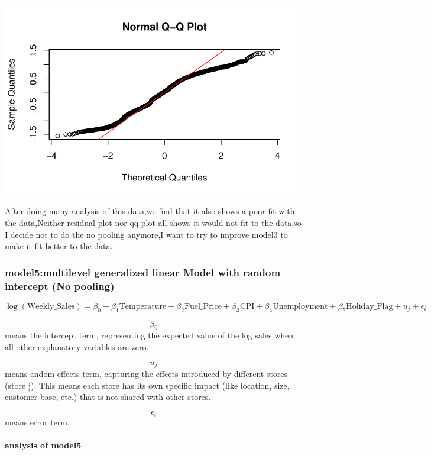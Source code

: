 \documentclass[
  letterpaper,
  DIV=11,
  numbers=noendperiod]{scrartcl}
\let\oldparagraph\paragraph
\renewcommand{\paragraph}[1]{\oldparagraph{#1}\mbox{}}
\begin{document}
\includegraphics{678final_files/figure-pdf/unnamed-chunk-12-1.pdf}

After doing many analysis of this data,we find that it also shows a poor
fit with the data,Neither residual plot nor qq plot all shows it would
not fit to the data,so I decide not to do the no pooling anymore,I want
to try to improve model3 to make it fit better to the data.

\hypertarget{model5multilevel-generalized-linear-model-with-random-intercept-no-pooling}{%
\subsubsection{model5:multilevel generalized linear Model with random
intercept (No
pooling)}\label{model5multilevel-generalized-linear-model-with-random-intercept-no-pooling}}

\[\log(\text{Weekly_Sales}) = \beta_0 + \beta_1 \text{Temperature} + \beta_2 \text{Fuel_Price} + \beta_3 \text{CPI} + \beta_4 \text{Unemployment} + \beta_5 \text{Holiday_Flag} + u_j + \epsilon_i\]

\[\beta_0\] means the intercept term, representing the expected value of
the log sales when all other explanatory variables are zero.

\[u_j\] means andom effects term, capturing the effects introduced by
different stores (store j). This means each store has its own specific
impact (like location, size, customer base, etc.) that is not shared
with other stores.

\[\epsilon_i\] means error term.

\hypertarget{analysis-of-model5}{%
\paragraph{analysis of model5}\label{analysis-of-model5}}
\end{document}

